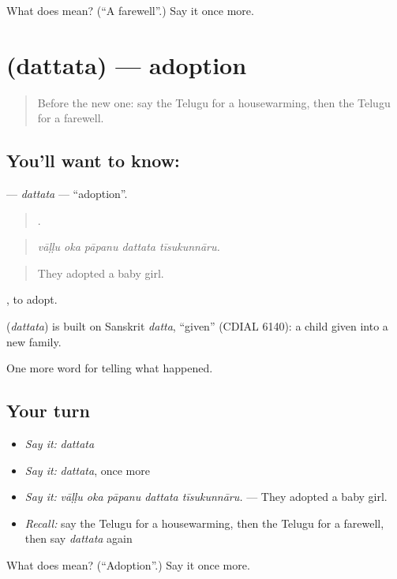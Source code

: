 \begin{tcolorbox}[breakable,colback=teal!4,colframe=teal!35!black,title={Before you move on}]
What does  mean? (\textquotedblleft{}A farewell\textquotedblright{}.) Say it once more.
\end{tcolorbox}
\section[\texorpdfstring{\te{దత్తత} (dattata)}{దత్తత (dattata)}]{ (dattata) — adoption}

\label{lesson:TE-C356-dattata}



\begin{quote}
Before the new one: say the Telugu for a housewarming, then the Telugu for a farewell.
\end{quote}

\subsection*{You'll want to know: }
\textbf{} — \emph{dattata} — \textquotedblleft{}adoption\textquotedblright{}.

\begin{quote}
    .
\end{quote}

\begin{quote}
\emph{vāḷḷu oka pāpanu dattata tīsukunnāru.}
\end{quote}

\begin{quote}
They adopted a baby girl.
\end{quote}

 , to adopt.

\begin{cousinweb}
\textbf{} (\emph{dattata}) is built on Sanskrit \emph{datta}, \textquotedblleft{}given\textquotedblright{} (CDIAL 6140): a child given into a new family.
\end{cousinweb}

\begin{grammarlens}[title={What you've built}]
One more word for telling what happened.
\end{grammarlens}

\subsection*{Your turn}
\begin{itemize}
\raggedright
  \item \emph{Say it:} \emph{dattata}
  \item \emph{Say it:} \emph{dattata}, once more
  \item \emph{Say it:} \emph{vāḷḷu oka pāpanu dattata tīsukunnāru.} — They adopted a baby girl.
  \item \emph{Recall:} say the Telugu for a housewarming, then the Telugu for a farewell, then say \emph{dattata} again
\end{itemize}

\begin{tcolorbox}[breakable,colback=teal!4,colframe=teal!35!black,title={Before you move on}]
What does  mean? (\textquotedblleft{}Adoption\textquotedblright{}.) Say it once more.
\end{tcolorbox}
